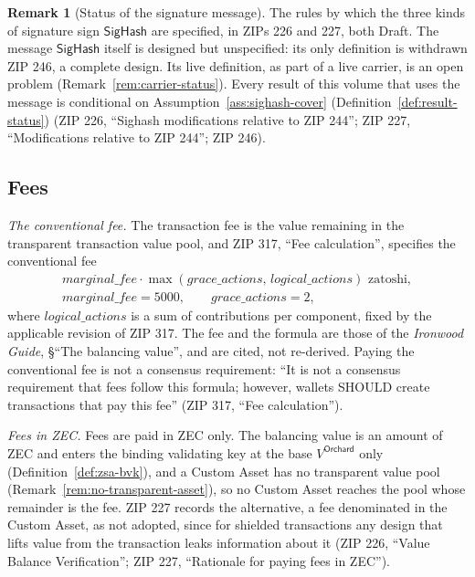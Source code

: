 \documentclass[11pt,a4paper]{article}
\theoremstyle{definition}
\newtheorem{remark}[theorem]{Remark}
\begin{document}
\begin{remark}[Status of the signature message]\label{rem:sighash-status}
The rules by which the three kinds of signature sign $\mathsf{SigHash}$
are specified, in ZIPs 226 and 227, both Draft. The message
$\mathsf{SigHash}$ itself is designed but unspecified: its only definition
is withdrawn ZIP 246, a complete design. Its live definition, as part of a
live carrier, is an open problem (Remark~\ref{rem:carrier-status}). Every
result of this volume that uses the message is conditional on
Assumption~\ref{ass:sighash-cover} (Definition~\ref{def:result-status})
(ZIP 226, ``Sighash modifications relative to ZIP 244''; ZIP 227,
``Modifications relative to ZIP 244''; ZIP 246).
\end{remark}

\subsection{Fees}\label{sec:carrier-fees}

\emph{The conventional fee.} The transaction fee is the value remaining in
the transparent transaction value pool, and ZIP 317, ``Fee calculation'',
specifies the conventional fee
\begin{gather*}
  \mathit{marginal\_fee} \cdot \max(\mathit{grace\_actions},\,
    \mathit{logical\_actions}) \text{ zatoshi}, \\
  \mathit{marginal\_fee} = 5000, \qquad \mathit{grace\_actions} = 2,
\end{gather*}
where $\mathit{logical\_actions}$ is a sum of contributions per component,
fixed by the applicable revision of ZIP 317. The fee and the formula are
those of the \emph{Ironwood Guide}, \S``The balancing value'', and are
cited, not re-derived. Paying the conventional fee is not a consensus
requirement: ``It is not a consensus requirement that fees follow this
formula; however, wallets SHOULD create transactions that pay this fee''
(ZIP 317, ``Fee calculation'').

\emph{Fees in ZEC.} Fees are paid in ZEC only. The balancing value is an
amount of ZEC and enters the binding validating key at the base
$V^{\mathsf{Orchard}}$ only (Definition~\ref{def:zsa-bvk}), and a Custom
Asset has no transparent value pool
(Remark~\ref{rem:no-transparent-asset}), so no Custom Asset reaches the
pool whose remainder is the fee. ZIP 227 records the alternative, a fee
denominated in the Custom Asset, as not adopted, since for shielded
transactions any design that lifts value from the transaction leaks
information about it (ZIP 226, ``Value Balance Verification''; ZIP 227,
``Rationale for paying fees in ZEC'').
\end{document}
